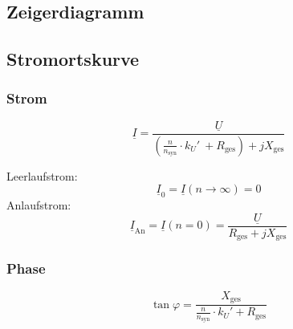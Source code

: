 \begin{sectionbox}
\subsection{Zeigerdiagramm}
\begin{center}

\end{center}
\end{sectionbox}

\begin{sectionbox}
\subsection{Stromortskurve}
\begin{center}

\end{center}
\end{sectionbox}

\begin{sectionbox}
\subsubsection{Strom}
\begin{emphbox}
\[\underline{I} = \frac{\underline{U}}{\left(\frac{n}{n_\text{syn}}\cdot k_U'\ + R_\text{ges}\right) + jX_\text{ges}}\]
\end{emphbox}
Leerlaufstrom:
\[\underline{I}_0 = \underline{I}(n\rightarrow\infty) = 0\]
Anlaufstrom:
\[\underline{I}_\text{An} = \underline{I}(n = 0) = \frac{\underline{U}}{R_\text{ges} + jX_\text{ges}}\]

\subsubsection{Phase}
\[\tan{\varphi} = \frac{X_\text{ges}}{\frac{n}{n_\text{syn}}\cdot k_U' + R_\text{ges}}\]
\end{sectionbox}
